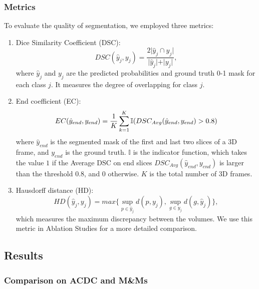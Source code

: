 \subsubsection{Metrics}
To evaluate the quality of segmentation, we employed three metrics:

\begin{enumerate}
    \item Dice Similarity Coefficient (DSC):
        \begin{equation}
            DSC(\hat{y}_{j},y_{j})=\frac{2 \vert \hat{y}_{j} \cap y_{j} \vert}{\vert \hat{y}_{j} \vert + \vert y_{j} \vert},
        \label{eq:DSC}
        \end{equation}
        where \(\hat{y}_{j}\) and \(y_{j}\) are the predicted probabilities and ground truth 0-1 mask for each class \(j\). It measures the degree of overlapping for class $j$.
    \item End coefficient (EC):
        \begin{equation}
            EC(\hat{y}_{end}, y_{end})=\frac{1}{K}\sum_{k=1}^{K} {\scalebox{1.0}{$\mathbb{I}$}(DSC_{Avg}(\hat{y}_{end}, y_{end}) > 0.8)}
        \label{eq:EC}
        \end{equation}
        where \(\hat{y}_{end}\) is the segmented mask of the first and last two slices of a 3D frame, and \(y_{end}\) is the ground truth. $\mathbb{I}$ is the indicator function, which takes the value $1$ if the Average DSC on end slices $DSC_{Avg}(\hat{y}_{end}, y_{end})$ is larger than the threshold $0.8$, and $0$ otherwise. $K$ is the total number of 3D frames.
    \item Hausdorff distance (HD):
    \begin{equation}
        HD(\hat{y}_{j},y_{j})=max\{ \sup_{p \in \hat{y}_{j}} d(p,y_{j}), \sup_{g \in y_{j}} d(g,\hat{y}_{j})\},
    \label{eq:HD}
    \end{equation}
    which measures the maximum discrepancy between the volumes. We use this metric in Ablation Studies for a more detailed comparison.
\end{enumerate}

\subsection{Results}
\label{sec: exp results}

\subsubsection{Comparison on ACDC and M\&Ms}

